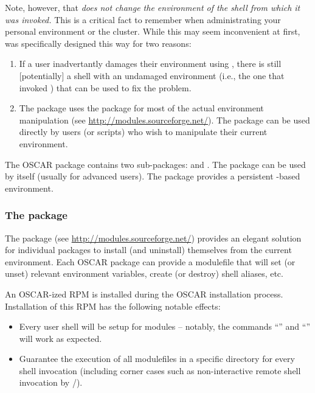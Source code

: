 Note, however, that {\em {} does not change the
  environment of the shell from which it was invoked.}  This is a
critical fact to remember when administrating your personal
environment or the cluster.  While this may seem inconvenient at
first,  was specifically designed this way for two
reasons:

\begin{enumerate}
\item If a user inadvertantly damages their environment using
  , there is still [potentially] a shell with an
  undamaged environment (i.e., the one that invoked )
  that can be used to fix the problem.
  
\item The  package uses the  package for
  most of the actual environment manipulation (see
  \url{http://modules.sourceforge.net/}).  The  package
  can be used directly by users (or scripts) who wish to manipulate
  their current environment.
\end{enumerate}

The OSCAR  package contains two sub-packages:
 and .  The  package can
be used by itself (usually for advanced users).  The
 package provides a persistent -based
environment.


\subsubsection{The  package}

The  package (see \url{http://modules.sourceforge.net/})
provides an elegant solution for individual packages to install (and
uninstall) themselves from the current environment.  Each OSCAR
package can provide a modulefile that will set (or unset) relevant
environment variables, create (or destroy) shell aliases, etc.

An OSCAR-ized  RPM is installed during the OSCAR
installation process.  Installation of this RPM has the following
notable effects:

\begin{itemize}
\item Every user shell will be setup for modules -- notably, the
  commands ``'' and ``'' will work as
  expected.
  
\item Guarantee the execution of all modulefiles in a specific
  directory for every shell invocation (including corner cases such as
  non-interactive remote shell invocation by /).
\end{itemize}

